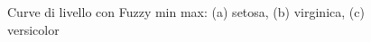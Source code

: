 \documentclass[11pt,  oneside, openany]{book}
\begin{document}
\begin{figure}[h!]
		\centering
		\quad
		 \quad
		 \quad
		\caption{Curve di livello con Fuzzy min max: (a) setosa, (b) virginica, (c) versicolor}
		\label{curvegfmm}
	\end{figure}	
\end{document}
